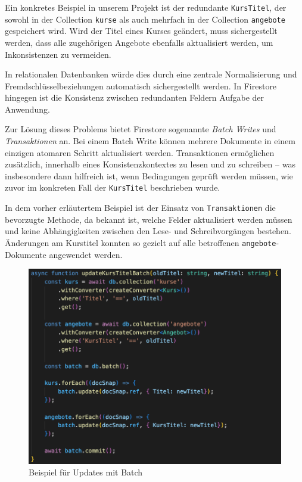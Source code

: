 \documentclass[12pt,a4paper%
              ,oneside     %
              ,titlepage
              ,DIV=13
              ,headinclude
              ,footinclude=false%
              ,cleardoublepage=empty%
              ,parskip=half,
              BCOR=0mm,
              ]{scrreprt}
\begin{document}
Ein konkretes Beispiel in unserem Projekt ist der redundante \texttt{KursTitel}, der sowohl in der Collection \texttt{kurse} als auch mehrfach in der Collection \texttt{angebote} gespeichert wird. Wird der Titel eines Kurses geändert, muss sichergestellt werden, dass alle zugehörigen Angebote ebenfalls aktualisiert werden, um Inkonsistenzen zu vermeiden.

In relationalen Datenbanken würde dies durch eine zentrale Normalisierung und Fremdschlüsselbeziehungen automatisch sichergestellt werden. In Firestore hingegen ist die Konsistenz zwischen redundanten Feldern Aufgabe der Anwendung.

Zur Lösung dieses Problems bietet Firestore sogenannte \textit{Batch Writes} und \textit{Transaktionen} an. Bei einem Batch Write können mehrere Dokumente in einem einzigen atomaren Schritt aktualisiert werden. Transaktionen ermöglichen zusätzlich, innerhalb eines Konsistenzkontextes zu lesen und zu schreiben – was insbesondere dann hilfreich ist, wenn Bedingungen geprüft werden müssen, wie zuvor im konkreten Fall der \texttt{KursTitel} beschrieben wurde. \cite{FirebasebaseTransaktionenBatches.2025}

In dem vorher erläutertem Beispiel ist der Einsatz von \texttt{Transaktionen} die bevorzugte Methode, da bekannt ist, welche Felder aktualisiert werden müssen und keine Abhängigkeiten zwischen den Lese- und Schreibvorgängen bestehen. Änderungen am Kurstitel konnten so gezielt auf alle betroffenen \texttt{angebote}-Dokumente angewendet werden.

\begin{figure}[H]
	\centering
	\includegraphics[width=\linewidth]{img/BatchUpdate.png}
	\caption{Beispiel für Updates mit Batch}
	\label{fig:code-example-0}
\end{figure}
\end{document}
